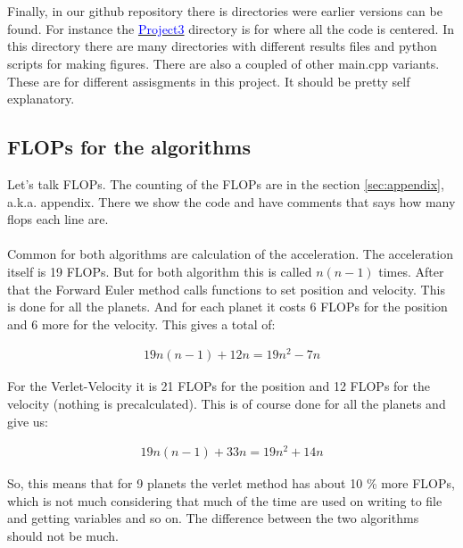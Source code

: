 \\
\\
Finally, in our github repository there is directories were earlier versions can be found. For instance the 
\href{https://github.com/erikfsk/Project-3/tree/master/Project3/}{\textcolor{blue}{Project3}} directory is for where all the code is centered. In this directory there are many directories with different results files and python scripts for making figures. There are also a coupled of other main.cpp variants. These are for different assisgments in this project. It should be pretty self explanatory. 


\subsection{FLOPs for the algorithms}\label{sec:flops}

Let's talk FLOPs. The counting of the FLOPs are in the section \ref{sec:appendix}, a.k.a. appendix. There we show the code and have comments that says how many flops each line are.
\\
\\
Common for both algorithms are calculation of the acceleration. The acceleration itself is 19 FLOPs. But for both algorithm this is called $n(n-1)$ times. After that the Forward Euler method calls functions to set position and velocity. This is done for all the planets. And for each planet it costs 6 FLOPs for the position and 6 more for the velocity. This gives a total of:

\begin{align*}
	19n(n-1) + 12n = 19n^2 - 7n
\end{align*}

For the Verlet-Velocity it is 21 FLOPs for the position and 12 FLOPs for the velocity (nothing is precalculated). This is of course done for all the planets and give us: 

\begin{align*}
	19n(n-1) + 33n = 19n^2 + 14n
\end{align*}

So, this means that for 9 planets the verlet method has about 10 \% more FLOPs, which is not much considering that much of the time are used on writing to file and getting variables and so on. The difference between the two algorithms should not be much.


























